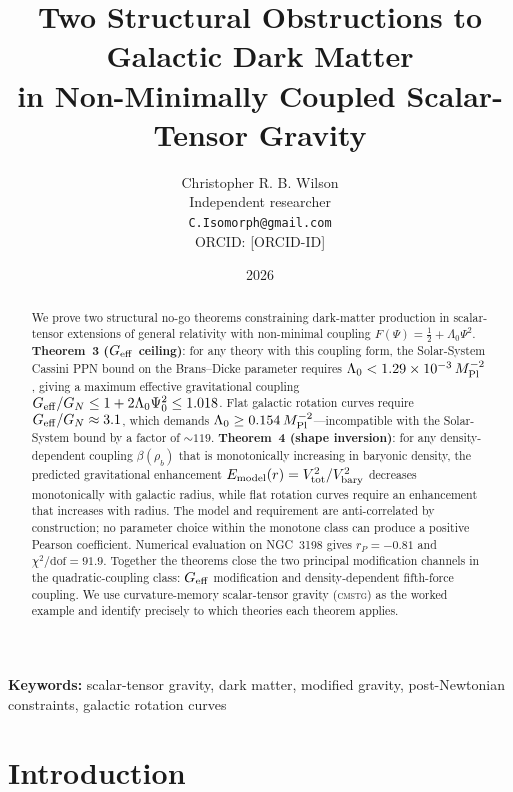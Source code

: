 \documentclass[12pt,a4paper]{article}
\title{\textbf{Two Structural Obstructions to Galactic Dark Matter\\
               in Non-Minimally Coupled Scalar-Tensor Gravity}}
\author{Christopher R. B. Wilson\\[4pt]
  \small Independent researcher\\
  \small\texttt{C.Isomorph@gmail.com}\\
  \small ORCID: [ORCID-ID]}
\date{2026}
\theoremstyle{plain}
\newcommand{\Mpl}{M_{\rm Pl}}
\newcommand{\rhob}{\rho_b}
\newcommand{\Vbary}{V_{\rm bary}}
\newcommand{\CMSTG}{\textsc{cmstg}}
\begin{document}
\maketitle

\begin{abstract}
We prove two structural no-go theorems constraining dark-matter
production in scalar-tensor extensions of general relativity with
non-minimal coupling $F(\Psi) = \tfrac{1}{2} + \Lambda_0\Psi^2$.
\textbf{Theorem~3 ($G_{\rm eff}$ ceiling)}: for any theory with this
coupling form, the Solar-System Cassini PPN bound on the Brans--Dicke
parameter requires $\Lambda_0 < 1.29\times10^{-3}\,\Mpl^{-2}$, giving a
maximum effective gravitational coupling $G_{\rm eff}/G_N \leq 1 +
2\Lambda_0\Psi_0^2 \leq 1.018$.  Flat galactic rotation curves require
$G_{\rm eff}/G_N \approx 3.1$, which demands $\Lambda_0 \geq 0.154\,
\Mpl^{-2}$---incompatible with the Solar-System bound by a factor of
$\sim\!119$.  \textbf{Theorem~4 (shape inversion)}: for any
density-dependent coupling $\beta(\rhob)$ that is monotonically
increasing in baryonic density, the predicted gravitational enhancement
$E_{\rm model}(r) = V_{\rm tot}^2/\Vbary^2$ decreases monotonically
with galactic radius, while flat rotation curves require an enhancement
that increases with radius.  The model and requirement are
anti-correlated by construction; no parameter choice within the
monotone class can produce a positive Pearson coefficient.  Numerical
evaluation on NGC~3198 gives $r_P = -0.81$ and
$\chi^2/\mathrm{dof} = 91.9$.  Together the theorems close the two
principal modification channels in the quadratic-coupling class: $G_{\rm
eff}$ modification and density-dependent fifth-force coupling.  We use
curvature-memory scalar-tensor gravity (\CMSTG) as the worked example
and identify precisely to which theories each theorem applies.
\end{abstract}

\noindent\textbf{Keywords:} scalar-tensor gravity, dark matter, modified gravity,
post-Newtonian constraints, galactic rotation curves

\tableofcontents

\section{Introduction}
\label{sec:intro}
\end{document}
